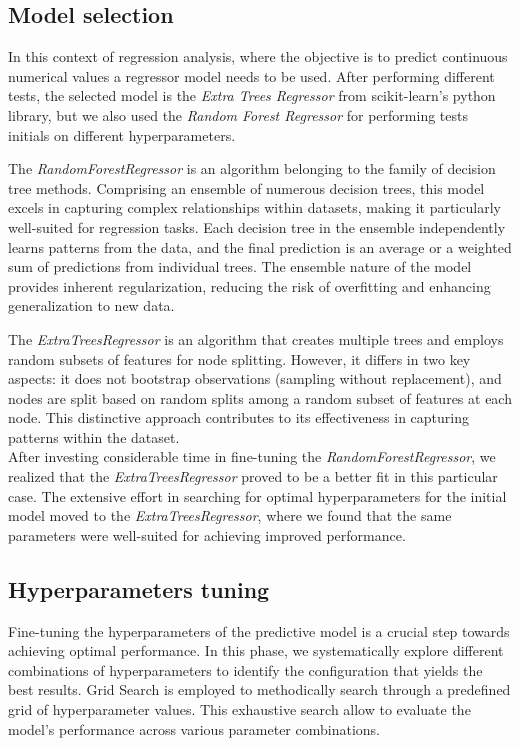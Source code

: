 \documentclass[conference]{IEEEtran}
\begin{document}
\subsection{Model selection}
In this context of regression analysis, where the objective is to predict continuous numerical values 
a regressor model needs to be used. After performing different tests, the selected model is the 
\textit{Extra Trees Regressor} from scikit-learn's python library, but we also used the 
\textit{Random Forest Regressor} for performing tests initials on different hyperparameters.

The \textit{RandomForestRegressor} is an algorithm belonging to the family of decision tree methods. 
Comprising an ensemble of numerous decision trees, this model excels in capturing complex 
relationships within datasets, making it particularly well-suited for regression tasks. 
Each decision tree in the ensemble independently learns patterns from the data, and the 
final prediction is an average or a weighted sum of predictions 
from individual trees. \cite{OpenAI_ChatGPT_help_me_on_this}
The ensemble nature of the model provides inherent regularization, reducing the risk of
overfitting and enhancing generalization to new data.

The \textit{ExtraTreesRegressor} is an algorithm that creates multiple trees and 
employs random subsets of features for node splitting. However, it differs in 
two key aspects: it does not bootstrap observations 
(sampling without replacement), and nodes are split based on random splits among a random subset
of features at each node. This distinctive approach contributes to its effectiveness in 
capturing patterns within the dataset. \cite{stackexchange_438384}\\

After investing considerable time in fine-tuning the \textit{RandomForestRegressor},
we realized that the \textit{ExtraTreesRegressor} proved to be a better fit in this 
particular case. The extensive effort in searching for optimal hyperparameters for 
the initial model moved to the \textit{ExtraTreesRegressor}, where 
we found that the same parameters were well-suited for achieving improved performance.


\subsection{Hyperparameters tuning}
Fine-tuning the hyperparameters of the predictive model is a crucial step towards 
achieving optimal performance. In this phase, we systematically explore different 
combinations of hyperparameters to identify the configuration that yields the best 
results. 
Grid Search is employed to methodically search through a predefined grid of 
hyperparameter values. This exhaustive search allow to evaluate the model's performance 
across various parameter combinations.\\
\end{document}
